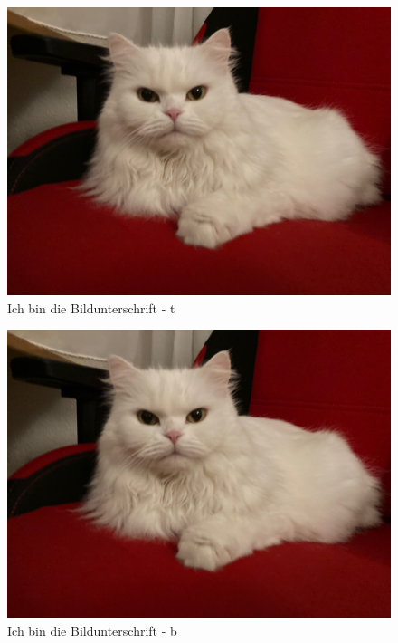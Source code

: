 \documentclass[12pt,ngerman]{scrartcl}
\begin{document}
\begin{figure}[t] %
\includegraphics[width=\textwidth]{Bilder/Katze}
\caption{Ich bin die Bildunterschrift - t}
\end{figure}

\blindtext[2]


\begin{figure}[h] %
\includegraphics[width=\textwidth]{Bilder/Katze}
\caption{Ich bin die Bildunterschrift - b}
\end{figure} 

\blindtext[2]
\end{document}
